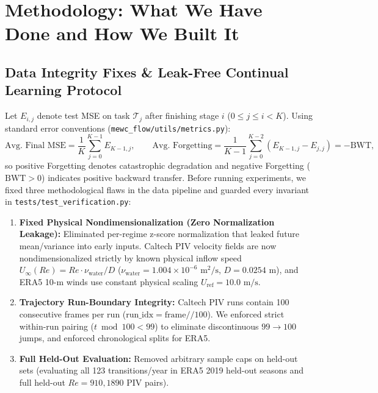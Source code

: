 \documentclass[11pt,a4paper]{article}
\begin{document}
\section{Methodology: What We Have Done and How We Built It}

\subsection{Data Integrity Fixes \& Leak-Free Continual Learning Protocol}

Let $E_{i, j}$ denote test MSE on task $\mathcal{T}_j$ after finishing stage $i$ ($0 \le j \le i < K$). Using standard error conventions (\texttt{mewc\_flow/utils/metrics.py}):
\begin{equation}
\text{Avg.\ Final MSE} = \frac{1}{K} \sum_{j=0}^{K-1} E_{K-1, j}, \qquad \text{Avg.\ Forgetting} = \frac{1}{K - 1} \sum_{j=0}^{K-2} \left(E_{K-1, j} - E_{j, j}\right) = -\text{BWT},
\end{equation}
so positive Forgetting denotes catastrophic degradation and negative Forgetting ($\text{BWT} > 0$) indicates positive backward transfer. Before running experiments, we fixed three methodological flaws in the data pipeline and guarded every invariant in \texttt{tests/test\_verification.py}:
\begin{enumerate}
  \item \textbf{Fixed Physical Nondimensionalization (Zero Normalization Leakage):} Eliminated per-regime z-score normalization that leaked future mean/variance into early inputs. Caltech PIV velocity fields are now nondimensionalized strictly by known physical inflow speed $U_{\infty}(Re) = Re \cdot \nu_{\text{water}} / D$ ($\nu_{\text{water}} = 1.004 \times 10^{-6}\text{ m}^2/\text{s}$, $D = 0.0254\text{ m}$), and ERA5 10-m winds use constant physical scaling $U_{\text{ref}} = 10.0\text{ m/s}$.
  \item \textbf{Trajectory Run-Boundary Integrity:} Caltech PIV runs contain 100 consecutive frames per run ($\text{run\_idx} = \text{frame} // 100$). We enforced strict within-run pairing ($t \bmod 100 < 99$) to eliminate discontinuous $99 \to 100$ jumps, and enforced chronological splits for ERA5.
  \item \textbf{Full Held-Out Evaluation:} Removed arbitrary sample caps on held-out sets (evaluating all 123 transitions/year in ERA5 2019 held-out seasons and full held-out $Re = 910, 1890$ PIV pairs).
\end{enumerate}
\end{document}
